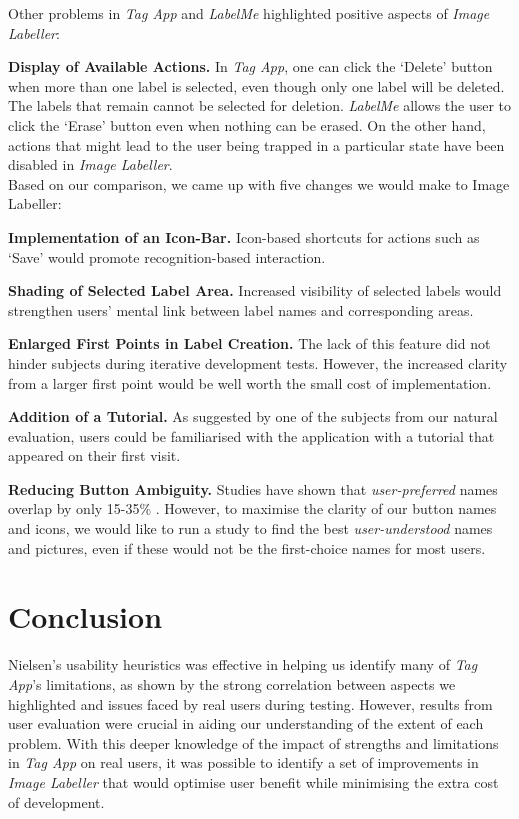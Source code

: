 \documentclass[11pt,twocolumn]{article}
\begin{document}
\noindent Other problems in \emph{Tag App} and \emph{LabelMe} highlighted positive aspects of
\emph{Image Labeller}:

\textbf{Display of Available Actions.} In \emph{Tag App}, one can click the
`Delete' button when more than one label is selected, even though only one
label will be deleted. The labels that remain cannot be selected for deletion.
\emph{LabelMe} allows the user to click the `Erase' button even when nothing can be
erased. On the other hand, actions that might lead to the user being trapped in
a particular state have been disabled in \emph{Image Labeller}. \\

Based on our comparison, we came up with five changes we would make to Image
Labeller:

\textbf{Implementation of an Icon-Bar.} Icon-based shortcuts for actions such as `Save' would promote recognition-based interaction.

 \textbf{Shading of Selected Label Area.} Increased visibility of selected labels would strengthen users' mental link between label names and corresponding areas.

\textbf{Enlarged First Points in Label Creation.} The lack of this feature did not hinder subjects during iterative development tests. However, the increased clarity from a larger first point would be well worth the small cost of implementation.

\textbf{Addition of a Tutorial.} As suggested by one of the subjects from our natural evaluation, users could be familiarised with the application with a tutorial that appeared on their first visit.

\textbf{Reducing Button Ambiguity.} Studies have shown that \emph{user-preferred} names overlap by only 15-35\% \cite{furnas1987}. However, to maximise the clarity of our button names and icons, we would like to run a study to find the best \emph{user-understood} names and pictures, even if these would not be the first-choice names for most users.  

\section{Conclusion}

Nielsen's usability heuristics was effective in helping us identify many of \emph{Tag App}'s limitations, as shown by the strong correlation between aspects we highlighted and issues faced by real users during testing. However, results from user evaluation were crucial in aiding our understanding of the extent of each problem. With this deeper knowledge of the impact of strengths and limitations in \emph{Tag App} on real users, it was possible to identify a set of improvements in \emph{Image Labeller} that would optimise user benefit while minimising the extra cost of development.
\end{document}
